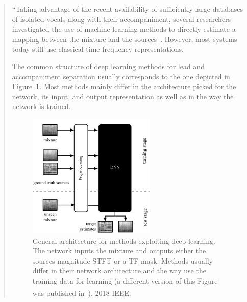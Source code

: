 \begin{quote}
``Taking advantage of the recent availability of sufficiently large databases of isolated vocals along with their accompaniment, several researchers investigated the use of machine learning methods to directly estimate a mapping between the mixture and the sources~\cite{huang14, uhlich15}.
However, most systems today still use classical time-frequency representations.

The common structure of deep learning methods for lead and accompaniment separation usually corresponds to the one depicted in Figure~\ref{fig:methods_dnn}.
Most methods mainly differ in the architecture picked for the network, its input, and output representation as well as in the way the network is trained.

\begin{figure}
  \centering
  \includegraphics[width=0.6\textwidth]{Chapters/06_Separation_Unknown/figures/methods_dnn.pdf}
  \caption{General architecture for methods exploiting deep learning. The network inputs the mixture and outputs either the sources magnitude STFT or a TF mask. Methods usually differ in their network architecture and the way use the training data for learning (a different version of this Figure was published in~\cite{rafii}). \textsuperscript{\textregistered}2018 IEEE.}
  \label{fig:methods_dnn}
\end{figure}


\end{quote}
